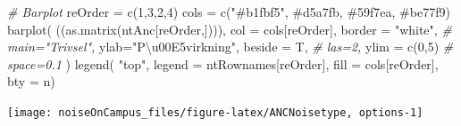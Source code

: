 \documentclass[
]{article}
\newenvironment{Shaded}{\begin{snugshade}}{\end{snugshade}}
\newcommand{\AttributeTok}[1]{\textcolor[rgb]{0.77,0.63,0.00}{#1}}
\newcommand{\CommentTok}[1]{\textcolor[rgb]{0.56,0.35,0.01}{\textit{#1}}}
\newcommand{\DecValTok}[1]{\textcolor[rgb]{0.00,0.00,0.81}{#1}}
\newcommand{\FunctionTok}[1]{\textcolor[rgb]{0.00,0.00,0.00}{#1}}
\newcommand{\NormalTok}[1]{#1}
\newcommand{\OtherTok}[1]{\textcolor[rgb]{0.56,0.35,0.01}{#1}}
\newcommand{\StringTok}[1]{\textcolor[rgb]{0.31,0.60,0.02}{#1}}
\begin{document}
\begin{Shaded}
\begin{Highlighting}[]
\CommentTok{\# Barplot}
\NormalTok{reOrder }\OtherTok{=} \FunctionTok{c}\NormalTok{(}\DecValTok{1}\NormalTok{,}\DecValTok{3}\NormalTok{,}\DecValTok{2}\NormalTok{,}\DecValTok{4}\NormalTok{)}
\NormalTok{cols }\OtherTok{=} \FunctionTok{c}\NormalTok{(}\StringTok{"\#b1fbf5"}\NormalTok{, }\StringTok{\textquotesingle{}\#d5a7fb\textquotesingle{}}\NormalTok{, }\StringTok{\textquotesingle{}\#59f7ea\textquotesingle{}}\NormalTok{, }\StringTok{\textquotesingle{}\#be77f9\textquotesingle{}}\NormalTok{)}
\FunctionTok{barplot}\NormalTok{(}
\NormalTok{  ((}\FunctionTok{as.matrix}\NormalTok{(ntAnc[reOrder,]))), }
  \AttributeTok{col =}\NormalTok{ cols[reOrder],}
  \AttributeTok{border =} \StringTok{"white"}\NormalTok{,}
  \CommentTok{\# main="Trivsel",}
  \AttributeTok{ylab=}\StringTok{"P\textbackslash{}u00E5virkning"}\NormalTok{,}
  \AttributeTok{beside =}\NormalTok{ T,}
  \CommentTok{\# las=2,}
  \AttributeTok{ylim =} \FunctionTok{c}\NormalTok{(}\DecValTok{0}\NormalTok{,}\DecValTok{5}\NormalTok{)}
  \CommentTok{\# space=0.1}
\NormalTok{)}
\FunctionTok{legend}\NormalTok{(}
  \StringTok{"top"}\NormalTok{,}
  \AttributeTok{legend =}\NormalTok{ ntRownames[reOrder],}
  \AttributeTok{fill =}\NormalTok{ cols[reOrder], }\AttributeTok{bty =} \StringTok{\textquotesingle{}n\textquotesingle{}}\NormalTok{)}
\end{Highlighting}
\end{Shaded}

\begin{center}\texttt{[image: noiseOnCampus\_files/figure-latex/ANCNoisetype, options-1]} \end{center}
\end{document}
